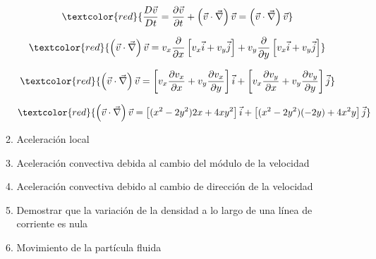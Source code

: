 \begin{enumerate}
\begin{enumerate}
		\[	\textcolor{red}{\frac{D\vec{v}}{Dt}=\frac{\partial\vec{v}}{\partial t}+\left(\vec{v}\cdot\vec{\nabla}\right)\vec{v}=\left(\vec{v}\cdot\vec{\nabla}\right)\vec{v}}\]
		
		\[\textcolor{red}{\left(\vec{v}\cdot\vec{\nabla}\right)\vec{v}=v_x\frac{\partial}{\partial x}\left[v_x\vec{i}+v_y\vec{j}\right]+v_y\frac{\partial}{\partial y}\left[v_x\vec{i}+v_y\vec{j}\right]}\]
		
		\[\textcolor{red}{\left(\vec{v}\cdot\vec{\nabla}\right)\vec{v}=\left[v_x\frac{\partial v_x}{\partial x} +v_y\frac{\partial v_x}{\partial y}\right]\vec{i}+\left[v_x\frac{\partial v_y}{\partial x} +v_y\frac{\partial v_y}{\partial y}\right]\vec{j}}\]
		
		\[\textcolor{red}{\left(\vec{v}\cdot\vec{\nabla}\right)\vec{v}=\left[(x^2-2y^2)2x+4xy^2\right]\vec{i}+\left[(x^2-2y^2)(-2y)+4x^2y\right]\vec{j}}\]

		\item Aceleración local
		\item Aceleración convectiva debida al cambio del módulo de la velocidad
		\item Aceleración convectiva debido al cambio de dirección de la velocidad
		\item Demostrar que la variación de la densidad a lo largo de una línea de corriente es nula
		\item  Movimiento de la partícula fluida
		
	\end{enumerate}
\end{enumerate}
